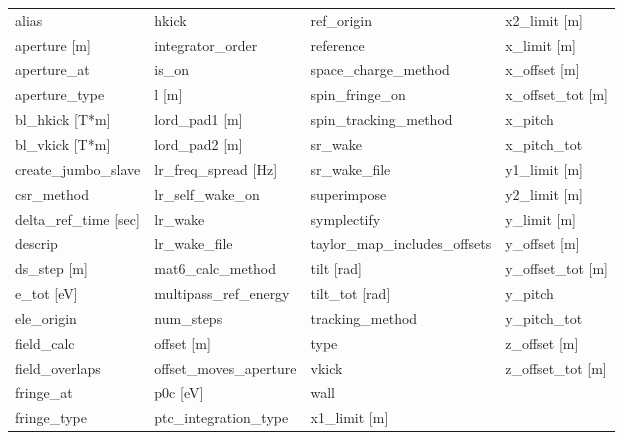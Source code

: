  \begin{tabular}{llll} \toprule
alias                          & hkick                          & ref_origin                     & x2_limit [m]                   \\
aperture [m]                   & integrator_order               & reference                      & x_limit [m]                    \\
aperture_at                    & is_on                          & space_charge_method            & x_offset [m]                   \\
aperture_type                  & l [m]                          & spin_fringe_on                 & x_offset_tot [m]               \\
bl_hkick [T*m]                 & lord_pad1 [m]                  & spin_tracking_method           & x_pitch                        \\
bl_vkick [T*m]                 & lord_pad2 [m]                  & sr_wake                        & x_pitch_tot                    \\
create_jumbo_slave             & lr_freq_spread [Hz]            & sr_wake_file                   & y1_limit [m]                   \\
csr_method                     & lr_self_wake_on                & superimpose                    & y2_limit [m]                   \\
delta_ref_time [sec]           & lr_wake                        & symplectify                    & y_limit [m]                    \\
descrip                        & lr_wake_file                   & taylor_map_includes_offsets    & y_offset [m]                   \\
ds_step [m]                    & mat6_calc_method               & tilt [rad]                     & y_offset_tot [m]               \\
e_tot [eV]                     & multipass_ref_energy           & tilt_tot [rad]                 & y_pitch                        \\
ele_origin                     & num_steps                      & tracking_method                & y_pitch_tot                    \\
field_calc                     & offset [m]                     & type                           & z_offset [m]                   \\
field_overlaps                 & offset_moves_aperture          & vkick                          & z_offset_tot [m]               \\
fringe_at                      & p0c [eV]                       & wall                           &                                \\
fringe_type                    & ptc_integration_type           & x1_limit [m]                   &                                \\
 \bottomrule
 \end{tabular}
 \vfill
 
